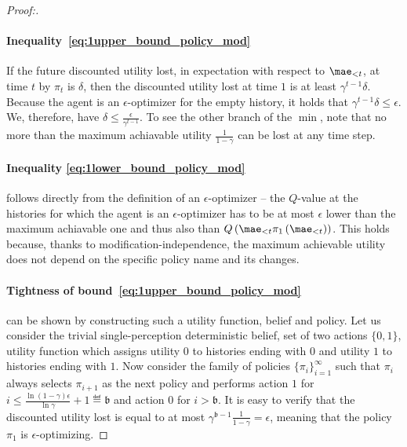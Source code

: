 \begin{proof}[Proof:]
\item
\vspace{-15px}
\paragraph{Inequality~\eqref{eq:1upper_bound_policy_mod}} If the future discounted utility lost, in expectation with respect to $\mae_{<t}$, at time $t$ by $\pi_t$ is $\delta$, then the discounted utility lost at time $1$ is at least $\gamma^{t-1} \delta$. Because the agent is an $\epsilon$-optimizer for the empty history, it holds that  $\gamma^{t-1} \delta \leq \epsilon$. We, therefore, have $\delta \leq \frac{\epsilon}{\gamma^{t-1}}$. To see the other branch of the $\min$, note that no more than the maximum achiavable utility $\frac{1}{1-\gamma}$ can be lost at any time step.

\paragraph{Inequality \eqref{eq:1lower_bound_policy_mod}} follows directly from the definition of an $\epsilon$-optimizer -- the $Q$-value at the histories for which the agent is an $\epsilon$-optimizer has to be at most $\epsilon$ lower than the maximum achiavable one and thus also than $Q\left(\mae_{<t} \pi_{1}\left(\mae_{<t}\right)\right)$. This holds because, thanks to modification-independence, the maximum achievable utility does not depend on the specific policy name and its changes.

\paragraph{Tightness of bound~\eqref{eq:1upper_bound_policy_mod}} can be shown by constructing such a utility function, belief and policy. Let us consider the trivial single-perception deterministic belief, set of two actions $\{0,1\}$, utility function which assigns utility $0$ to histories ending with $0$ and utility $1$ to histories ending with $1$. Now consider the family of policies $\{\pi_i\}_{i=1}^\infty$ such that $\pi_i$ always selects $\pi_{i+1}$ as the next policy and performs action $1$ for $i \leq \frac{\ln(1-\gamma)\epsilon}{\ln \gamma} + 1 \eqdef \mathfrak{b}$
and action $0$ for $i > \mathfrak{b}$. It is easy to verify that the discounted utility lost is equal to at most $\gamma^{\mathfrak{b}-1}\frac{1}{1-\gamma} = \epsilon$, meaning that the policy $\pi_1$ is $\epsilon$-optimizing.


\end{proof}
